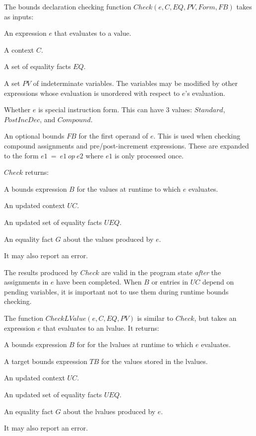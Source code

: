 The bounds declaration checking function $Check(e, C, EQ, PV, Form, FB)$   takes as inputs:
\begin{compactenum}
\item An expression $e$ that evaluates to a value.
\item A context $C$.
\item A set of equality facts $EQ$.
\item A set $PV$ of indeterminate variables.  The variables 
may be modified by other expressions whose  evaluation is unordered with respect to $e$'s evaluation.
\item Whether $e$ is special instruction form.  This can have 3 values: $Standard$, $PostIncDec$,
and $Compound$.
\item An optional bounds $FB$ for the first operand of $e$.  
This is used when checking compound assignments and pre/post-increment expressions.  These are
expanded to the form $e1~=~e1~op~e2$ where $e1$ is only processed once. 
\end{compactenum}

$Check$ returns:
\begin{compactenum}
\item A bounds expression $B$ for the values at runtime to which $e$ evaluates.
\item An updated context $UC$.
\item An updated set of equality facts $UEQ$.
\item An equality fact $G$ about the values produced by $e$. 
\item It may also report an error.
\end{compactenum}
The results produced by $Check$ are valid in the program state
{\em after} the assignments in $e$ have been completed.   When $B$ or entries in 
$UC$ depend on pending variables, it is important not to use them during runtime bounds checking.

The function $CheckLValue(e, C, EQ, PV)$ is similar to $Check$, but takes an
expression $e$ that evaluates to an lvalue.  It returns:
\begin{compactenum}
\item A bounds expression $B$ for for the lvalues at runtime to which $e$ evaluates.
\item A target bounds expression $TB$ for the values stored in the lvalues.
\item An updated context $UC$.
\item An updated set of equality facts $UEQ$.
\item An equality fact $G$ about the lvalues produced by $e$. 
\item  It may also report an error.
\end{compactenum}

